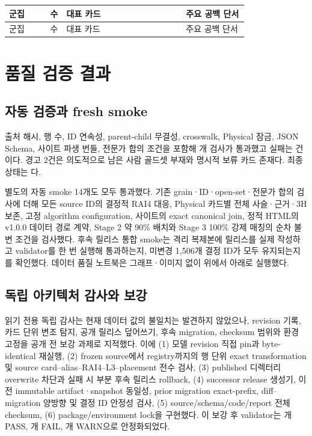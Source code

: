\documentclass[11pt,a4paper]{article}
\newcommand{\code}[1]{\texttt{#1}}
\begin{document}
\begin{landscape}
\small
\begin{longtable}{L{0.10\linewidth}rL{0.50\linewidth}L{0.26\linewidth}}
\toprule
군집 & 수 & 대표 카드 & 주요 공백 단서 \\
\midrule
\endfirsthead
\toprule
군집 & 수 & 대표 카드 & 주요 공백 단서 \\
\midrule
\endhead

\end{longtable}
\end{landscape}

\section{품질 검증 결과}

\subsection{자동 검증과 fresh smoke}

출처 해시, 행 수, ID 연속성, parent-child 무결성, crosswalk, Physical 잠금, JSON Schema, 사이트 파생 번들, 전문가 합의 조건을 포함해 \ValidationPassed{}개 검사가 통과했고 실패는 \ValidationFailed{}건이다. 경고 2건은 의도적으로 남은 사람 골드셋 부재와 명시적 보류 카드 존재다. 최종 상태는 \code{\ValidationStatus}다.

별도의 자동 smoke 14개도 모두 통과했다. 기존 grain·ID·open-set·전문가 합의 검사에 더해 모든 source ID의 결정적 RAI4 대응, Physical 카드별 전체 사슬·근거·3H 보존, 고정 algorithm configuration, 사이트의 exact canonical join, 정적 HTML의 v1.0.0 데이터 경로 계약, Stage 2 약 90\% 배치와 Stage 3 100\% 강제 매칭의 순차 불변 조건을 검사했다. 후속 릴리스 통합 smoke는 격리 복제본에 릴리스를 실제 작성하고 validator를 한 번 실행해 통과하는지, 미변경 1,506개 결정 ID가 모두 유지되는지를 확인했다. 데이터 품질 노트북은 그래프·이미지 없이 위에서 아래로 실행했다.

\subsection{독립 아키텍처 감사와 보강}

읽기 전용 독립 감사는 현재 데이터 값의 불일치는 발견하지 않았으나, revision 기록, 카드 단위 변조 탐지, 공개 릴리스 덮어쓰기, 후속 migration, checksum 범위와 환경 고정을 공개 전 보강 과제로 지적했다. 이에 (1) 모델 revision 직접 pin과 byte-identical 재실행, (2) frozen source에서 registry까지의 행 단위 exact transformation 및 source card--alias--RAI4--L3--placement 전수 검사, (3) published 디렉터리 overwrite 차단과 실패 시 부분 후속 릴리스 rollback, (4) successor release 생성기, 이전 immutable artifact·snapshot 동일성, prior migration exact-prefix, diff--migration 양방향 및 결정 ID 안정성 검사, (5) source/schema/code/report 전체 checksum, (6) package/environment lock을 구현했다. 이 보강 후 validator는 \ValidationPassed{}개 PASS, \ValidationFailed{}개 FAIL, \ValidationWarnings{}개 WARN으로 안정화되었다.
\end{document}
